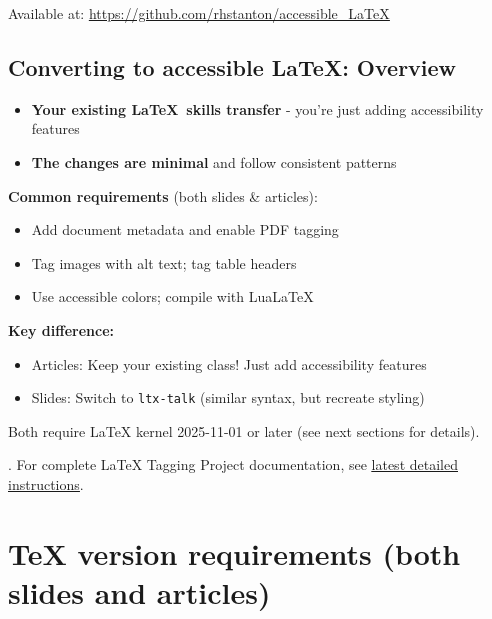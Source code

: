 \documentclass{article}
\newcommand{\hrefu}[2]{\href{#1}{\uline{#2}}}  %
\newcommand{\urlu}[1]{\uline{\url{#1}}}        %
\begin{document}
\noindent Available at: \urlu{https://github.com/rhstanton/accessible_LaTeX}

\subsection{Converting to accessible LaTeX: Overview}

\begin{itemize}
\item {\color{AccessibleGreen}\textbf{Your existing \LaTeX\ skills transfer}} - you're just adding accessibility features
\item {\color{AccessibleGreen}\textbf{The changes are minimal}} and follow consistent patterns
\end{itemize}

\bigskip

\noindent \textbf{Common requirements} (both slides \& articles):
\begin{itemize}
\item Add document metadata and enable PDF tagging
\item Tag images with alt text; tag table headers
\item Use accessible colors; compile with LuaLaTeX
\end{itemize}

\bigskip

\noindent \textbf{Key difference:}
\begin{itemize}
\item Articles: {\color{AccessibleGreen}Keep your existing class!} Just add accessibility features
\item Slides: Switch to \texttt{ltx-talk} (similar syntax, but recreate styling)
\end{itemize}

\bigskip

\noindent Both require LaTeX kernel 2025-11-01 or later (see next sections for details).

\bigskip

. For complete LaTeX Tagging Project documentation, see \hrefu{https://latex3.github.io/tagging-project/documentation/usage-instructions}{latest detailed instructions}.




\section{TeX version requirements (both slides and articles)}
\end{document}
